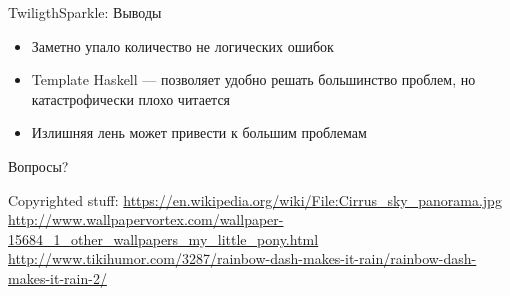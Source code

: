 \documentclass[10pt]{beamer}
\begin{document}
\begin{frame}{TwiligthSparkle: Выводы}
  \begin{itemize}
    \item Заметно упало количество не логических ошибок
    \item Template Haskell — позволяет удобно решать большинство проблем, но
    катастрофически плохо читается
    \item Излишняя лень может привести к большим проблемам
  \end{itemize}
\end{frame}

\begin{frame}
  \begin{center}
    \Large
    Вопросы?
  \end{center}
\end{frame}

\begin{frame}\label{lastframe}
  Copyrighted stuff:
  \footnotesize
  \url{https://en.wikipedia.org/wiki/File:Cirrus\_sky\_panorama.jpg} \\
  \url{http://www.wallpapervortex.com/wallpaper-15684\_1\_other\_wallpapers\_my\_little\_pony.html} \\
  \url{http://www.tikihumor.com/3287/rainbow-dash-makes-it-rain/rainbow-dash-makes-it-rain-2/}
\end{frame}
\end{document}
